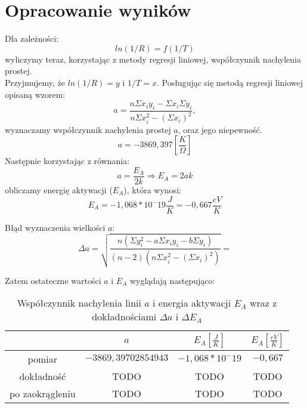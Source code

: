 \documentclass[10pt,a4paper]{article}
\newcommand{\forceindent}{\leavevmode{\parindent=3em\indent}}
\begin{document}
\section{Opracowanie wyników}
\forceindent Dla zależności:
\begin{equation}
ln(1/R) = f(1/T)
\end{equation}  
wyliczymy teraz, korzystając z metody regresji liniowej, współczynnik nachylenia prostej.\\
Przyjmujemy, że $ln(1/R) = y$ i $1/T = x$.
Posługując się metodą regresji liniowej opisaną wzorem:
\begin{equation}
a=\frac{n\Sigma x_i y_i - \Sigma x_i \Sigma y_i}{n\Sigma x_i^2 - (\Sigma x_i)^2},
\end{equation}
wyznaczamy współczynnik nachylenia prostej $a$, oraz jego niepewność. 
\begin{equation}
a = -3869,397 \left[\frac{K}{\Omega}\right]
\end{equation}
Następnie korzystając z równania:
\begin{equation}
a = \frac{E_A}{2k} \Rightarrow E_A = 2ak
\end{equation}
obliczamy energię aktywacji ($E_A$), która wynosi:
$$ E_A = -1,068 * 10^-19 \frac{J}{K} = -0,667 \frac{eV}{K} $$

Błąd wyznaczenia wielkości $a$:\\
$$ \Delta a = \sqrt{\frac{n(\Sigma y_i ^2 - a \Sigma x_i y_i - b\Sigma y_i)}{(n-2)(n \Sigma x_i ^2 - (\Sigma x_i)^2)}} = $$


\forceindent Zatem ostateczne wartości $a$ i $E_A$ wyglądają następująco:

\begin{table}[!h]
\centering
\begin{tabular}{|cc||c|c|}
\multicolumn{1}{c}{} & \multicolumn{1}{c}{$a$} & \multicolumn{1}{c}{$E_A [\frac{J}{K}]$} & \multicolumn{1}{c}{$E_A [\frac{eV}{K}]$}\\
\hline
pomiar & $-3869,39702854943$ & $-1,068 * 10^-19$ & $-0,667$\\
\hline
dokładność & TODO & TODO & TODO\\
\hline
po zaokrągleniu & TODO  & TODO & TODO\\
\hline
\end{tabular}
\caption{Współczynnik nachylenia linii $a$ i energia aktywacji $E_A$ wraz z dokładnościami $\Delta a$ i $\Delta E_A$}
\end{table}
\end{document}
